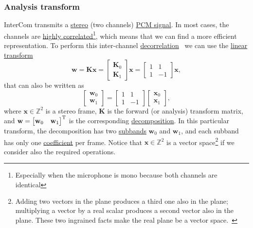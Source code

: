 \subsubsection{Analysis transform}
InterCom transmits a
\href{https://en.wikipedia.org/wiki/Stereophonic_sound}{stereo} (two
channels)
\href{https://en.wikipedia.org/wiki/Pulse-code_modulation}{PCM
  signal}. In most cases, the channels are
\href{https://en.wikipedia.org/wiki/Binaural_recording}{highly
  correlated}\footnote{Especially when the microphone is mono because both
channels are identical}, which means that we can find a more efficient
representation. To perform this inter-channel
\href{https://en.wikipedia.org/wiki/Decorrelation}{decorrelation}~\cite{thinkstats}
we can use the \href{https://en.wikipedia.org/wiki/Linear_map}{linear
  transform}~\cite{strang4linear}
\begin{equation}
  {\mathbf w} = {\mathbf K}{\mathbf x} =
\begin{bmatrix} \mathbf{K}_0 \\ \mathbf{K}_1 \end{bmatrix}{\mathbf x} =
\begin{bmatrix} 1 & 1 \\ 1 & -1 \end{bmatrix}
{\mathbf x},
  \label{eq:forward_transform_matrix_form}
\end{equation}
that can also be written as
\begin{equation}
  \begin{bmatrix}
    {\mathbf w}_0 \\
    {\mathbf w}_1
  \end{bmatrix}
  = 
  \begin{bmatrix} 1 & 1 \\ 1 & -1 \end{bmatrix}
  \begin{bmatrix}
    {\mathbf x}_0 \\
    {\mathbf x}_1
  \end{bmatrix},
  \label{eq:forward_transform_matrix_form2}
\end{equation}
where ${\mathbf x}\in\mathbb{Z}^2$ is a stereo frame, ${\mathbf K}$ is
the forward (or analysis) transform matrix, and
${\mathbf w}=\begin{bmatrix} {\mathbf w}_0 & {\mathbf
    w}_1\end{bmatrix}^{\text T}$ is the corresponding
\href{https://en.wikipedia.org/wiki/Discrete_wavelet_transform}{decomposition}. In
this particular transform, the decomposition has two
\href{https://en.wikipedia.org/wiki/Sub-band_coding}{subbands}
${\mathbf w}_0$ and ${\mathbf w}_1$, and each subband has only one
\href{https://web.stanford.edu/class/ee398a/handouts/lectures/07-TransformCoding.pdf}{coefficient} per frame. Notice
that ${\mathbf x}\in\mathbb{Z}^2$ is a vector space\footnote{Adding
  two vectors in the plane produces a third one also in the plane;
  multiplying a vector by a real scalar produces a second vector also
  in the plane. These two ingrained facts make the real plane be a
  vector space.~\cite{vetterli2014foundations}} if we consider also
the required operations.

